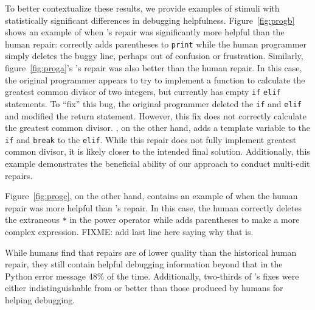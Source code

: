 To better contextualize these results, we provide examples of stimuli with
statistically significant differences in debugging helpfulness. 
Figure~\ref{fig:progb} shows an example
of when \toolname's repair was significantly more helpful than the human repair: 
 \toolname correctly adds parentheses to \texttt{print} 
while the human programmer simply deletes the 
buggy line, perhaps out of confusion or frustration.
Similarly, figure~\ref{fig:proga}'s \toolname's repair was also
better than the human repair. In this case, the original programmer appears to try to
implement a function to calculate the greatest common divisor of two integers,
but currently has empty \texttt{if} \texttt{elif} statements. 
To ``fix'' this bug, the original programmer
deleted the \texttt{if} and \texttt{elif} and modified the return statement.
However, this fix does not correctly calculate the greatest common divisor.
\toolname, on the other hand, adds a template variable to the \texttt{if} and 
\texttt{break} to the \texttt{elif}. While this repair does not fully implement
greatest common divisor, it is likely closer to the intended final solution.
Additionally, this example demonstrates the beneficial ability of our approach
to conduct multi-edit repairs. 

Figure~\ref{fig:progc}, on the other hand, contains an example of when the
human repair was more helpful than \toolname's repair. In this case, the
human correctly deletes the extraneous \texttt{*} in the power operator
while \toolname adds parentheses to make a more complex expression. 
FIXME: add last line here saying why that is.

\begin{framed}
  \noindent 
While humans find that \toolname repairs are 
of lower quality than the historical human repair, they still contain helpful 
debugging information beyond that in the Python error message 48\% of the time. 
Additionally, two-thirds of \toolname's fixes were either indistinguishable from
or better than those produced by humans for helping debugging.
\end{framed}
